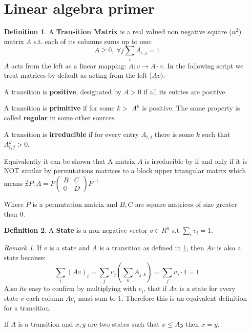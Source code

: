 \documentclass[a4paper,10pt]{article}
\theoremstyle{definition}
\newtheorem{mydef}{Definition}[section]
\theoremstyle{remark}
\newtheorem{remark}{Remark}
\theoremstyle{plain}
\begin{document}
\section{Linear algebra primer}

\begin{mydef}
\label{def:transition}
A \textbf{Transition Matrix} is a real valued non negative square ($n^2$) matrix $A$ s.t. each of its
columns sums up to one: $$A \geq 0,\ \forall j \sum_i A_{i,j} = 1$$
$A$ acts from the left as a linear mapping:
$A:v \to A \cdot v$. In the following script we treat matrices by default
as acting from the left ($Av$). 

A transition is \textbf{positive}, designated by $A > 0$ if all its entries are positive.

A transition is \textbf{primitive} if for some $k>$ $A^k$ is positive. The same
property is called \textbf{regular} in some other sources.

A transition is \textbf{irreducible} if for every entry $A_{i,j}$ there is some $k$ such
that $A^k_{i,j} > 0$.

Equivalently it can be shown that 
A matrix $A$ is 
irreducible by if and only if it is NOT
similar by permutations matrices to a block upper triangular matrix
which means 
$
\nexists P : 
A =
P
\begin{pmatrix}
B & C \\
0 & D
\end{pmatrix}
P^{-1}
$

Where $P$ is a permutation matrix and $B, C$ are square matrices of size greater than $0$.
\end{mydef}

\begin{mydef}
\label{def:state}
A \textbf{State} is a non-negative vector $v \in R^n$ s.t $\sum_i v_i = 1$.
\end{mydef}

\begin{remark}
\label{remark:state}
If $v$ is a
state and $A$ is a transition as defined in
\ref{def:transition}, then
  $Av$ is also a state because: 
$$\sum_i(Av)_i = \sum_j v_j(\sum_k A_{j,k}) = \sum_j v_j \cdot 1 = 1$$
Also its easy to confirm by multiplying with $e_i$, that if $Av$ is a state
for every state $v$ 
each column $A e_i$ must sum to $1$.
Therefore this is an equivalent definition for a transition.

If $A$ is a transition and $x,y$ are two states such that
$x \leq Ay$ then $x=y$.
\end{remark}
\end{document}

